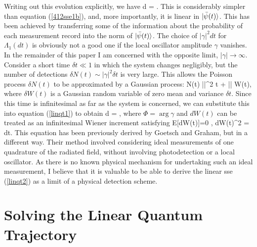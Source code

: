 \documentclass[12pt]{article}
\begin{document}
Writing out this evolution explicitly, we have
\beq \label{linqt1}
d =  .
\eeq
This is considerably simpler than equation (\ref{412sse1b}), and, more importantly,
it is linear in $| {\bar\psi(t)} \rangle$. This has been achieved by transferring some
of the information about the probability of each measurement record into the norm
of $| {\bar\psi(t)} \rangle$. The choice of
$|\gamma|^2 dt$ for $\Lambda_1(dt)$ is obviously not a good one if the local
oscillator amplitude $\gamma$ vanishes. In the remainder of this paper I am concerned
with the opposite limit, $|\gamma| \to \infty$. Consider a short time $\delta t \ll
1$ in which the system changes negligibly, but the number of detections $\delta N(t)
\sim |\gamma|^2 \delta t$ is very large. This allows the Poisson process $\delta
N(t)$  to be approximated by a Gaussian process:  
\beq \delta N(t) \simeq |\gamma|^2 \delta t +
|\gamma| \delta W(t), \eeq
where $\delta W(t)$ is a Gaussian random variable of zero mean and variance $\delta t$. Since
this time is infinitesimal as far as the system is concerned, we can substitute this
into equation (\ref{linqt1}) to obtain
 \beq \label{linqt2}
d =  ,
\eeq
where $\Phi = \arg \gamma$ and $dW(t)$ can be treated as an infinitesimal Wiener
increment \cite{Gar85} satisfying
\beq
{\rm E}[dW(t)]=0 \;,\;\; dW(t)^2 = dt.
\eeq
This equation has been previously derived by Goetsch and Graham, but in a
different way. Their method involved considering ideal measurements of one
quadrature of the radiated field, without involving photodetection or a local
oscillator. As there is no known physical mechanism for undertaking such an ideal
measurement, I believe that it is valuable to be able to derive the linear {\sc sse}
(\ref{linqt2}) as a limit of a physical detection scheme.

\section{Solving the Linear Quantum Trajectory}
\end{document}

